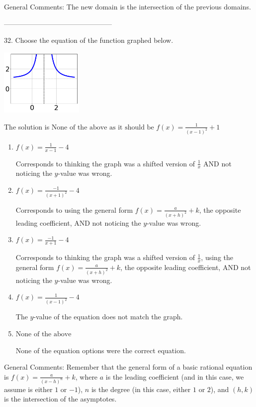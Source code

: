 \documentclass{extbook}[14pt]
\begin{document}
General Comments: The new domain is the intersection of the previous domains.

-----------------------------------------------

32. Choose the equation of the function graphed below.
\begin{center} \includegraphics[width=0.3\textwidth]{../Figures/rationalGraphToEquationB.png} \end{center} 

The solution is $ \text{None of the above as it should be } f(x) = \frac{1}{(x - 1)^2} + 1 $ 

\begin{enumerate}[label=\Alph*.] 
\item $ f(x) = \frac{1}{x - 1} - 4 $ 

 Corresponds to thinking the graph was a shifted version of $\frac{1}{x}$ AND not noticing the $y$-value was wrong. 
\item $ f(x) = \frac{-1}{(x + 1)^2} - 4 $ 

 Corresponds to using the general form $f(x) = \frac{a}{(x+h)^2}+k$, the opposite leading coefficient, AND not noticing the $y$-value was wrong. 
\item $ f(x) = \frac{-1}{x + 1} - 4 $ 

 Corresponds to thinking the graph was a shifted version of $\frac{1}{x}$, using the general form $f(x) = \frac{a}{(x+h)^2}+k$, the opposite leading coefficient, AND not noticing the $y$-value was wrong. 
\item $ f(x) = \frac{1}{(x - 1)^2} - 4 $ 

 The $y$-value of the equation does not match the graph. 
\item $ \text{None of the above} $ 

 None of the equation options were the correct equation. 
\end{enumerate} 
 
General Comments: Remember that the general form of a basic rational equation is $ f(x) = \frac{a}{(x-h)^n} + k$, where $a$ is the leading coefficient (and in this case, we assume is either $1$ or $-1$), $n$ is the degree (in this case, either $1$ or $2$), and $(h, k)$ is the intersection of the asymptotes.
\end{document}
